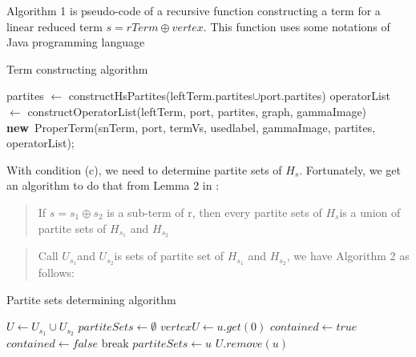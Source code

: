 \documentclass[a4paper, 12pt]{article}
\begin{document}
Algorithm 1 is pseudo-code of a recursive function constructing a term for a linear reduced term {$s=rTerm\oplus vertex$}. This function uses some notations of Java programming language

\begin{algorithm}
\caption{Term constructing algorithm}
\begin{algorithmic}[1]
	\Else
	\EndIf
	\State partites {$\gets$} constructHsPartites(leftTerm.partites{$\cup$}port.partites)
	\State operatorList {$\gets$} constructOperatorList(leftTerm, port,
                partites, graph, gammaImage)\linebreak
	\State \Return \textbf{new}\ ProperTerm(snTerm, port, termVs, usedlabel,
                gammaImage, partites, operatorList);
\EndFunction
\end{algorithmic}

\end{algorithm}

With condition (c), we need to determine partite sets of \textit {$H_{s}$}. Fortunately, we get an algorithm to do that from Lemma 2 in \cite {vadim-lozin} : 

\begin{quotation}
If $s=s_{1}\oplus s_{2}$ is a sub-term of r, then every partite sets of \textit {$H_{s}$}is a union of partite sets of $H_{s_{1}}$ and $H_{s_{2}}$ 
\end{quotation}

\begin{quotation}
Call $U_{s_{1}}$and $U_{s_{2}}$is sets of partite set of $H_{s_{1}}$ and $H_{s_{2}}$, we have Algorithm 2 as follows:
\end{quotation}

\begin{algorithm}[H]
\caption{Partite sets determining algorithm}
\begin{algorithmic}[1]
	\State $U\gets U_{s_{1}} \cup U_{s_{2}}$ 
		\State $partiteSets\leftarrow\emptyset$
			\State $vertexU\gets u.get(0)$
				\State $contained\gets true$
					\State $contained\gets false$
					\State break
				\EndIf
			\EndFor
				\State $partiteSets\gets u$
				\State $U.remove(u)$
			\EndIf
		\EndFor
	\EndWhile 
\end{algorithmic}
\end{algorithm}
\end{document}
